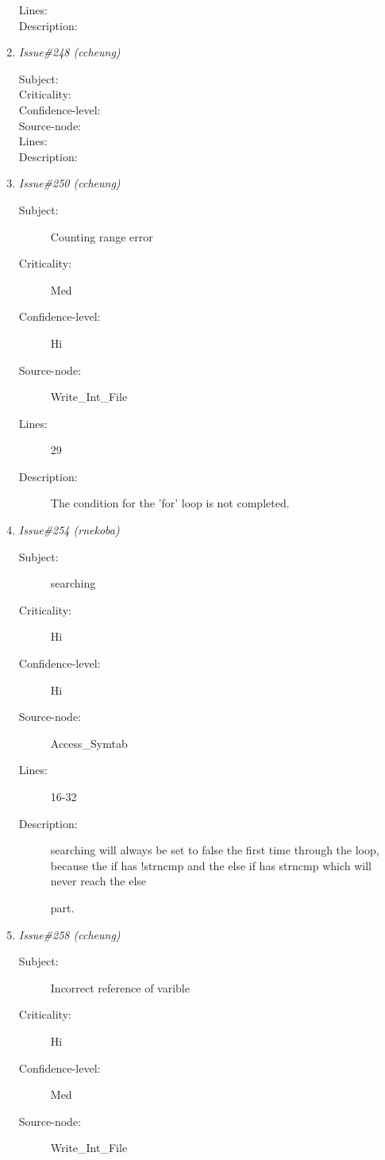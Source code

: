 \begin{enumerate}
\begin{description}
\item [Lines:] 

\item [Description:] 
\end{description}
\item {\it Issue\#248 (ccheung)}
\begin{description}
\item [Subject:] 
\item [Criticality:] 
\item [Confidence-level:] 
\item [Source-node:] 

\item [Lines:] 

\item [Description:] 
\end{description}
\item {\it Issue\#250 (ccheung)}
\begin{description}
\item [Subject:] Counting range error
\item [Criticality:] Med
\item [Confidence-level:] Hi
\item [Source-node:] Write\_Int\_File

\item [Lines:] 29

\item [Description:] The condition for the 'for' loop is not completed.
\end{description}
\item {\it Issue\#254 (rnekoba)}
\begin{description}
\item [Subject:] searching
\item [Criticality:] Hi
\item [Confidence-level:] Hi
\item [Source-node:] Access\_Symtab

\item [Lines:] 16-32

\item [Description:] searching will always be set to false the
first time through the loop, because the if has !strncmp and the else if has
strncmp which will never reach the else

part.
\end{description}
\item {\it Issue\#258 (ccheung)}
\begin{description}
\item [Subject:] Incorrect reference of varible
\item [Criticality:] Hi
\item [Confidence-level:] Med
\item [Source-node:] Write\_Int\_File


\end{description}
\end{enumerate}

